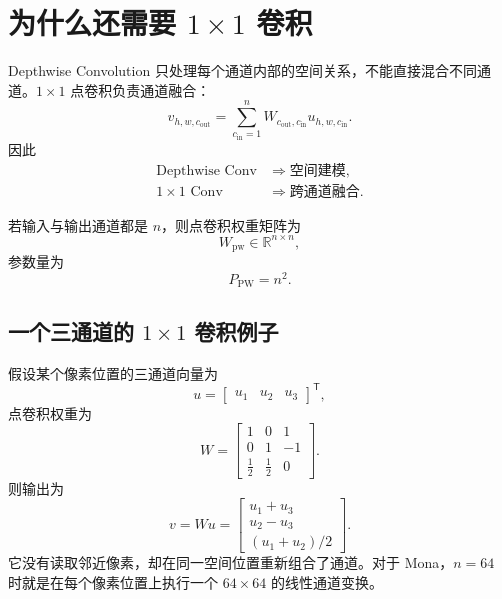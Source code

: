 \documentclass[UTF8,12pt,a4paper,fontset=none]{ctexart}
\newcommand{\R}{\mathbb{R}}
\begin{document}
\section{为什么还需要 \texorpdfstring{$1\times1$}{1x1} 卷积}

Depthwise Convolution 只处理每个通道内部的空间关系，不能直接混合不同通道。$1\times1$ 点卷积负责通道融合：
\begin{equation}
 v_{h,w,c_{\mathrm{out}}}
 =\sum_{c_{\mathrm{in}}=1}^{n}
 W_{c_{\mathrm{out}},c_{\mathrm{in}}}
 u_{h,w,c_{\mathrm{in}}}.
\end{equation}
因此
\begin{align}
 \text{Depthwise Conv}&\Rightarrow\text{空间建模},\\
 1\times1\text{ Conv}&\Rightarrow\text{跨通道融合}.
\end{align}

若输入与输出通道都是 $n$，则点卷积权重矩阵为
\begin{equation}
 W_{\mathrm{pw}}\in\R^{n\times n},
\end{equation}
参数量为
\begin{equation}
 P_{\mathrm{PW}}=n^2.
\end{equation}



\subsection{一个三通道的 \texorpdfstring{$1\times1$}{1x1} 卷积例子}

假设某个像素位置的三通道向量为
\begin{equation}
 u=\begin{bmatrix}u_1&u_2&u_3\end{bmatrix}^{\mathsf T},
\end{equation}
点卷积权重为
\begin{equation}
 W=
 \begin{bmatrix}
 1&0&1\\
 0&1&-1\\
 \tfrac12&\tfrac12&0
 \end{bmatrix}.
\end{equation}
则输出为
\begin{equation}
 v=Wu
 =\begin{bmatrix}
 u_1+u_3\\
 u_2-u_3\\
 (u_1+u_2)/2
 \end{bmatrix}.
\end{equation}
它没有读取邻近像素，却在同一空间位置重新组合了通道。对于 Mona，$n=64$ 时就是在每个像素位置上执行一个 $64\times64$ 的线性通道变换。
\end{document}
